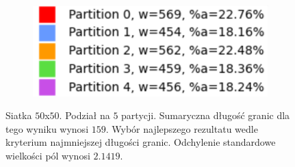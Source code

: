 \begin{figure}[h]
\centering
\begin{subfigure}{.33\textwidth}
    \centering
    \caption[short]{}
\end{subfigure}%
\begin{subfigure}{.33\textwidth}
    \centering
    \caption[short]{}
\end{subfigure}%
\begin{subfigure}{.33\textwidth}
    \centering
    \includegraphics[width=0.9\linewidth]{images/results/m_k/with/10/results}
    \caption[short]{}
\end{subfigure}
\caption{Siatka $50$x$50$. Podział na $5$ partycji. Sumaryczna długość granic dla tego wyniku wynosi $159$.
Wybór najlepszego rezultatu wedle kryterium najmniejszej długości granic.
Odchylenie standardowe wielkości pól wynosi $2.1419$.}
\label{result:10}
\end{figure}


